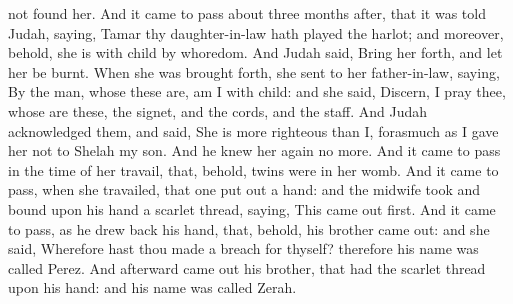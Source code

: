 not found her.  And it came to pass about three months after, that it was told Judah, saying, Tamar thy daughter-in-law hath played the harlot; and moreover, behold, she is with child by whoredom. And Judah said, Bring her forth, and let her be burnt. When she was brought forth, she sent to her father-in-law, saying, By the man, whose these are, am I with child: and she said, Discern, I pray thee, whose are these, the signet, and the cords, and the staff. And Judah acknowledged them, and said, She is more righteous than I, forasmuch as I gave her not to Shelah my son. And he knew her again no more. And it came to pass in the time of her travail, that, behold, twins were in her womb. And it came to pass, when she travailed, that one put out a hand: and the midwife took and bound upon his hand a scarlet thread, saying, This came out first. And it came to pass, as he drew back his hand, that, behold, his brother came out: and she said, Wherefore hast thou made a breach for thyself? therefore his name was called Perez. And afterward came out his brother, that had the scarlet thread upon his hand: and his name was called Zerah. 

